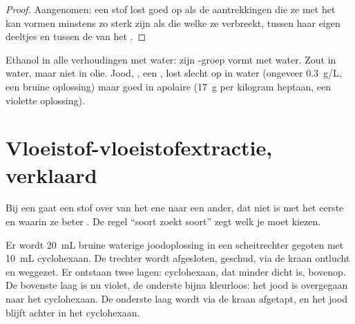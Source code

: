 \begin{proof}
Aangenomen: een stof lost goed op als de aantrekkingen die ze met het
 kan vormen minstens zo sterk zijn als die welke ze verbreekt,
tussen haar eigen deeltjes en tussen de  van het .
\end{proof}

\begin{example}\label{ex:g11:dissolution:cases}
Ethanol  in alle verhoudingen met water: zijn -groep vormt
 met water. Zout  in water, maar niet in olie.
Jood, , een , lost slecht op in water (ongeveer
\qty{0.3}{g/L}, een bruine oplossing) maar goed in apolaire
 (\qty{17}{g} per kilogram heptaan, een violette oplossing).
\end{example}

\section{Vloeistof-vloeistofextractie, verklaard}

Bij een  gaat een stof over van het ene
 naar een ander, dat niet  is met het eerste en waarin
ze beter . De regel ``soort zoekt soort'' zegt welk  je
moet kiezen.

\begin{inthelab}
Er wordt \qty{20}{mL} bruine waterige joodoplossing in een scheitrechter
gegoten met \qty{10}{mL} cyclohexaan. De trechter wordt afgesloten,
geschud, via de kraan ontlucht en weggezet. Er ontstaan twee lagen:
cyclohexaan, dat minder dicht is, bovenop. De bovenste laag is nu
violet, de onderste bijna kleurloos: het jood is overgegaan naar het
cyclohexaan. De onderste laag wordt via de kraan afgetapt, en het jood
blijft achter in het cyclohexaan.
\end{inthelab}


